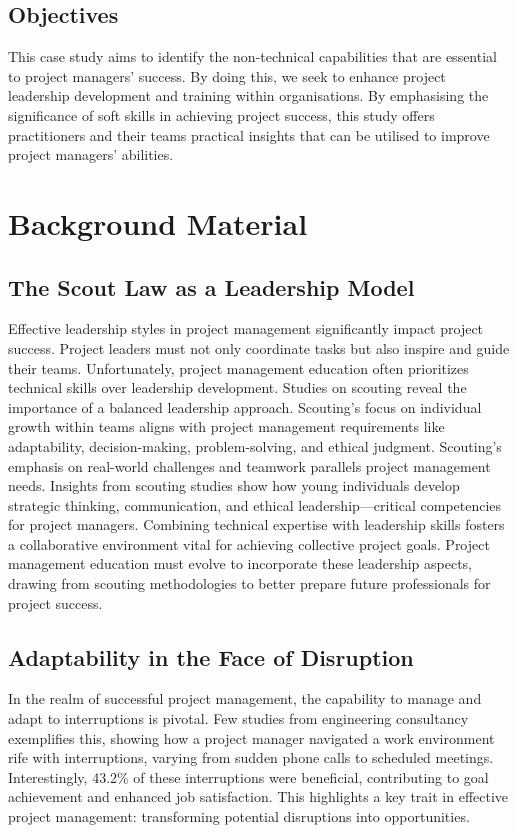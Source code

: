 \documentclass{article}
\begin{document}
\subsection{Objectives}
This case study aims to identify the non-technical capabilities that are essential to project managers' success. By doing this, we seek to enhance project leadership development and training within organisations. By emphasising the significance of soft skills in achieving project success, this study offers practitioners and their teams practical insights that can be utilised to improve project managers' abilities.

\section{Background Material}
\subsection{The Scout Law as a Leadership Model}

Effective leadership styles in project management significantly impact project success. Project leaders must not only coordinate tasks but also inspire and guide their teams. Unfortunately, project management education often prioritizes technical skills over leadership development. Studies on scouting reveal the importance of a balanced leadership approach. Scouting's focus on individual growth within teams aligns with project management requirements like adaptability, decision-making, problem-solving, and ethical judgment. Scouting's emphasis on real-world challenges and teamwork parallels project management needs. Insights from scouting studies show how young individuals develop strategic thinking, communication, and ethical leadership—critical competencies for project managers. Combining technical expertise with leadership skills fosters a collaborative environment vital for achieving collective project goals. Project management education must evolve to incorporate these leadership aspects, drawing from scouting methodologies to better prepare future professionals for project success. \cite{kaluzny2022scouting}

\subsection{Adaptability in the Face of Disruption}
In the realm of successful project management, the capability to manage and adapt to interruptions is pivotal. Few studies from engineering consultancy exemplifies this, showing how a project manager navigated a work environment rife with interruptions, varying from sudden phone calls to scheduled meetings. Interestingly, 43.2\% of these interruptions were beneficial, contributing to goal achievement and enhanced job satisfaction. This highlights a key trait in effective project management: transforming potential disruptions into opportunities.
\end{document}
